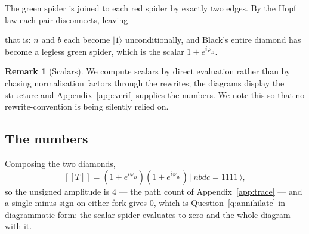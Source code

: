 \documentclass[11pt,a4paper]{article}
\theoremstyle{definition}
\newtheorem{remark}[definition]{Remark}
\theoremstyle{plain}
\newcommand{\lbr}{[\![}
\newcommand{\rbr}{]\!]}
\newcommand{\gr}[1]{\lbr #1 \rbr}
\begin{document}
\begin{center}
\end{center}

The green spider is joined to each red spider by exactly two edges. By the Hopf
law each pair disconnects, leaving

\begin{center}
\end{center}

that is: $n$ and $b$ each become $|1\rangle$ unconditionally, and Black's entire
diamond has become a legless green spider, which is the scalar
$1+e^{i\varphi_B}$.

\begin{remark}[Scalars]
We compute scalars by direct evaluation rather than by chasing normalisation
factors through the rewrites; the diagrams display the structure and
Appendix~\ref{app:verif} supplies the numbers. We note this so that no
rewrite-convention is being silently relied on.
\end{remark}

\subsection{The numbers}

Composing the two diamonds,
\[
  \gr{T} = (1+e^{i\varphi_B})(1+e^{i\varphi_W})\,
           \big|\,nbdc = 1111\,\big\rangle ,
\]
so the unsigned amplitude is $4$ --- the path count of
Appendix~\ref{app:trace} --- and a single minus sign on either fork gives $0$,
which is Question~\ref{q:annihilate} in diagrammatic form: the scalar spider
evaluates to zero and the whole diagram with it.
\end{document}
